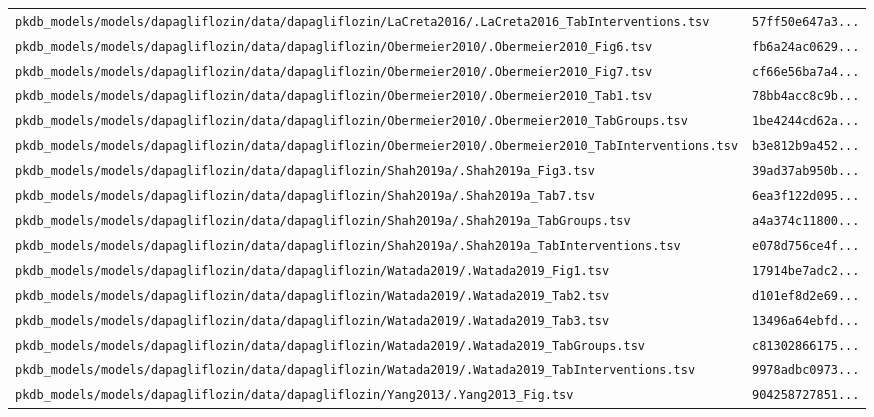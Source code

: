 \documentclass{article}
\begin{document}
\begin{longtable}{ll}
\texttt{pkdb\_models/models/dapagliflozin/data/dapagliflozin/LaCreta2016/.LaCreta2016\_TabInterventions.tsv} & \texttt{57ff50e647a3...} \\
\texttt{pkdb\_models/models/dapagliflozin/data/dapagliflozin/Obermeier2010/.Obermeier2010\_Fig6.tsv} & \texttt{fb6a24ac0629...} \\
\texttt{pkdb\_models/models/dapagliflozin/data/dapagliflozin/Obermeier2010/.Obermeier2010\_Fig7.tsv} & \texttt{cf66e56ba7a4...} \\
\texttt{pkdb\_models/models/dapagliflozin/data/dapagliflozin/Obermeier2010/.Obermeier2010\_Tab1.tsv} & \texttt{78bb4acc8c9b...} \\
\texttt{pkdb\_models/models/dapagliflozin/data/dapagliflozin/Obermeier2010/.Obermeier2010\_TabGroups.tsv} & \texttt{1be4244cd62a...} \\
\texttt{pkdb\_models/models/dapagliflozin/data/dapagliflozin/Obermeier2010/.Obermeier2010\_TabInterventions.tsv} & \texttt{b3e812b9a452...} \\
\texttt{pkdb\_models/models/dapagliflozin/data/dapagliflozin/Shah2019a/.Shah2019a\_Fig3.tsv} & \texttt{39ad37ab950b...} \\
\texttt{pkdb\_models/models/dapagliflozin/data/dapagliflozin/Shah2019a/.Shah2019a\_Tab7.tsv} & \texttt{6ea3f122d095...} \\
\texttt{pkdb\_models/models/dapagliflozin/data/dapagliflozin/Shah2019a/.Shah2019a\_TabGroups.tsv} & \texttt{a4a374c11800...} \\
\texttt{pkdb\_models/models/dapagliflozin/data/dapagliflozin/Shah2019a/.Shah2019a\_TabInterventions.tsv} & \texttt{e078d756ce4f...} \\
\texttt{pkdb\_models/models/dapagliflozin/data/dapagliflozin/Watada2019/.Watada2019\_Fig1.tsv} & \texttt{17914be7adc2...} \\
\texttt{pkdb\_models/models/dapagliflozin/data/dapagliflozin/Watada2019/.Watada2019\_Tab2.tsv} & \texttt{d101ef8d2e69...} \\
\texttt{pkdb\_models/models/dapagliflozin/data/dapagliflozin/Watada2019/.Watada2019\_Tab3.tsv} & \texttt{13496a64ebfd...} \\
\texttt{pkdb\_models/models/dapagliflozin/data/dapagliflozin/Watada2019/.Watada2019\_TabGroups.tsv} & \texttt{c81302866175...} \\
\texttt{pkdb\_models/models/dapagliflozin/data/dapagliflozin/Watada2019/.Watada2019\_TabInterventions.tsv} & \texttt{9978adbc0973...} \\
\texttt{pkdb\_models/models/dapagliflozin/data/dapagliflozin/Yang2013/.Yang2013\_Fig.tsv} & \texttt{904258727851...} \\

\end{longtable}
\end{document}
